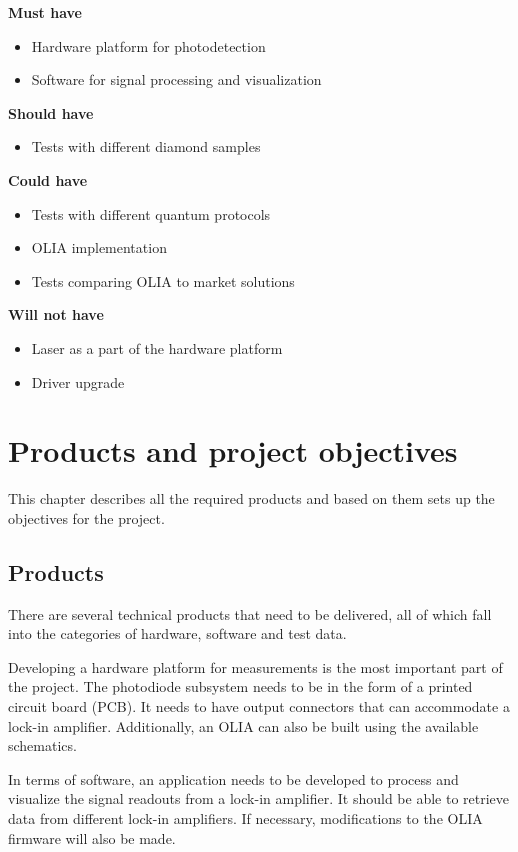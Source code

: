 \documentclass{report}
\begin{document}
	\textbf{Must have}
	\begin{itemize}
		\item Hardware platform for photodetection
		\item Software for signal processing and visualization
	\end{itemize}
	
	\textbf{Should have}
	\begin{itemize}
		\item Tests with different diamond samples
	\end{itemize}
	
	\textbf{Could have}
	\begin{itemize}
		\item Tests with different quantum protocols
		\item OLIA implementation
		\item Tests comparing OLIA to market solutions
	\end{itemize}
	
	\textbf{Will not have}
	\begin{itemize}
		\item Laser as a part of the hardware platform
		\item Driver upgrade
	\end{itemize}
	
	
	\chapter{Products and project objectives}
	This chapter describes all the required products and based on them sets up the objectives for the project.
	
	\section{Products}
	There are several technical products that need to be delivered, all of which fall into the categories of hardware, software and test data.
	
	Developing a hardware platform for measurements is the most important part of the project. The photodiode subsystem needs to be in the form of a printed circuit board (PCB). It needs to have output connectors that can accommodate a lock-in amplifier. Additionally, an OLIA can also be built using the available schematics. 
	
	In terms of software, an application needs to be developed to process and visualize the signal readouts from a lock-in amplifier. It should be able to retrieve data from different lock-in amplifiers. If necessary, modifications to the OLIA firmware will also be made. 
	
\end{document}
